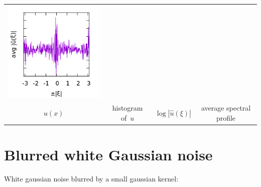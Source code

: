 \begin{tabular}{cccc}
	\includegraphics{w256_p.png} \\
	$u(x)$ &
	histogram of~$u$ &
	$\log|\hat u(\xi)|$ &
	average spectral profile
\end{tabular}


\section{Blurred white Gaussian noise}

White gaussian noise blurred by a small gaussian kernel:

